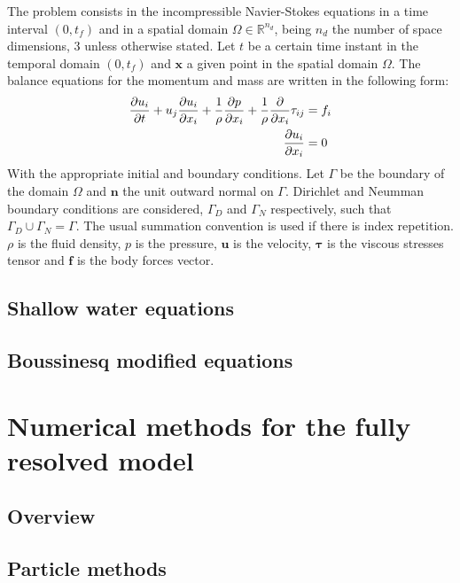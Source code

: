 The problem consists in the incompressible Navier-Stokes equations in a time interval $(0, t_f)$ and in a spatial domain $\Omega \in \mathbb{R}^{n_d}$, being $n_d$ the number of space dimensions, $3$ unless otherwise stated. Let $t$ be a certain time instant in the temporal domain $(0, t_f)$ and $\mathbf{x}$ a given point in the spatial domain $\Omega$. The balance equations for the momentum and mass are written in the following form:
\begin{subequations}
    \begin{align}
        \frac{\partial u_i}{\partial t} + u_j \frac{\partial u_i}{\partial x_i} + \frac{1}{\rho} \frac{\partial p}{\partial x_i} +
            \frac{1}{\rho} \frac{\partial}{\partial x_i} \tau_{ij} &= f_i \\
        \frac{\partial u_i}{\partial x_i} &= 0
    \end{align}
\end{subequations}
With the appropriate initial and boundary conditions. Let $\Gamma$ be the boundary of the domain $\Omega$ and $\mathbf{n}$ the unit outward normal on $\Gamma$. Dirichlet and Neumman boundary conditions are considered, $\Gamma_D$ and $\Gamma_N$ respectively, such that $\Gamma_D \cup \Gamma_N = \Gamma$.
The usual summation convention is used if there is index repetition.
$\rho$ is the fluid density, $p$ is the pressure, $\mathbf{u}$ is the velocity, $\bm{\tau}$ is the viscous stresses tensor and $\mathbf{f}$ is the body forces vector.



\subsection{Shallow water equations}


\subsection{Boussinesq modified equations}




\section{Numerical methods for the fully resolved model}

\subsection{Overview}

\subsection{Particle methods}




